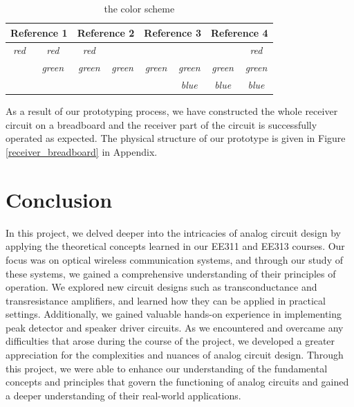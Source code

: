 \documentclass[a4paper,10pt]{IEEEtran}
\begin{document}
\begin{table}[]
    \caption{the color scheme}
    \label{tab:array}
    \begin{tabular}{|cc|cc|cc|cc|}
    \hline
    \multicolumn{2}{|c|}{\textbf{Reference 1}}          & \multicolumn{2}{c|}{\textbf{Reference 2}}            & \multicolumn{2}{c|}{\textbf{Reference 3}}            & \multicolumn{2}{c|}{\textbf{Reference 4}}            \\ \hline
    \multicolumn{1}{|c|}{\textit{red}} & \textit{red}   & \multicolumn{1}{c|}{\textit{red}}   & \textit{}      & \multicolumn{1}{c|}{\textit{}}      & \textit{}      & \multicolumn{1}{c|}{\textit{}}      & \textit{red}   \\ \hline
    \multicolumn{1}{|c|}{\textit{}}    & \textit{green} & \multicolumn{1}{c|}{\textit{green}} & \textit{green} & \multicolumn{1}{c|}{\textit{green}} & \textit{green} & \multicolumn{1}{c|}{\textit{green}} & \textit{green} \\ \hline
    \multicolumn{1}{|c|}{\textit{}}    & \textit{}      & \multicolumn{1}{c|}{\textit{}}      & \textit{}      & \multicolumn{1}{c|}{\textit{}}      & \textit{blue}  & \multicolumn{1}{c|}{\textit{blue}}  & \textit{blue}  \\ \hline
    \end{tabular}
\end{table}
As a result of our prototyping process, we have constructed the whole receiver circuit on a breadboard and the receiver part of the circuit is successfully operated as expected. The physical structure of our prototype is given in Figure \ref{receiver_breadboard} in Appendix.
\section{Conclusion}
In this project, we delved deeper into the intricacies of analog circuit design by applying the theoretical concepts learned in our EE311 and EE313 courses. Our focus was on optical wireless communication systems, and through our study of these systems, we gained a comprehensive understanding of their principles of operation. We explored new circuit designs such as transconductance and transresistance amplifiers, and learned how they can be applied in practical settings. Additionally, we gained valuable hands-on experience in implementing peak detector and speaker driver circuits. As we encountered and overcame any difficulties that arose during the course of the project, we developed a greater appreciation for the complexities and nuances of analog circuit design. Through this project, we were able to enhance our understanding of the fundamental concepts and principles that govern the functioning of analog circuits and gained a deeper understanding of their real-world applications.
\end{document}
